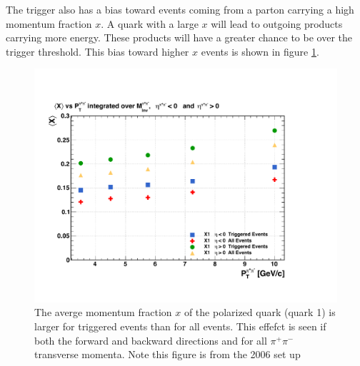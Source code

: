 \documentclass[abstract = on,listof=totoc, bibliography=totoc]{scrreprt}
\newcommand{\pip}{\pi^+}
\newcommand{\pim}{\pi^-}
\newcommand{\pair}{$\pip\pim$ }
\begin{document}

The trigger also has a bias toward events coming from a parton carrying a high momentum fraction $x$. A quark with a large $x$ will lead to outgoing products carrying more energy. These products will have a greater chance to be over the trigger threshold. This bias toward higher $x$ events is shown in figure \ref{fig:TriggerBiasXHiQualColor}. 

\begin{figure}
\begin{center}
\includegraphics[width = 1\textwidth]{TriggerBiasXHiQualColor}
\caption[Trigger bias toward higher momentum fraction $x$ events]{The averge momentum fraction $x$ of the polarized quark (quark 1) is larger for triggered events than for all events. This effefct is seen if both the forward and backward directions and for all \pair transverse momenta. Note this figure is from the 2006 set up}
\label{fig:TriggerBiasXHiQualColor}
\end{center}
\end{figure}
\end{document}
